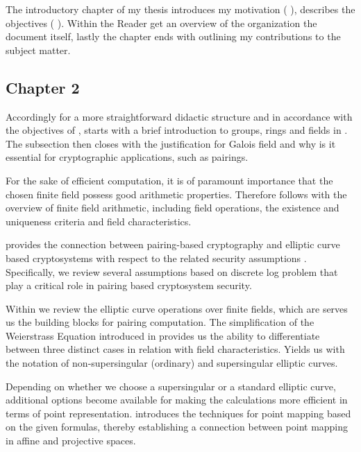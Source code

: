 The introductory chapter of my thesis introduces my motivation ( ), describes the objectives ( ). Within  the Reader get an overview of the organization the document itself, lastly the chapter ends with  outlining my contributions to the subject matter. 



\subsection*{Chapter 2}

Accordingly for a more straightforward didactic structure and  in accordance with the objectives of  , 
starts with a brief introduction to groups, rings and fields in . The subsection then closes with the justification for Galois field and why is it essential for cryptographic applications, such as pairings.


For the sake of efficient computation, it is of paramount importance that the chosen finite field possess good arithmetic properties. Therefore  
  follows with the overview of finite field arithmetic, including field operations, the existence and uniqueness criteria and field characteristics.
  

 provides the connection between pairing-based cryptography and elliptic curve based cryptosystems with respect to the related security assumptions . Specifically, we review several assumptions based on discrete log problem that play a critical role in pairing based cryptosystem security.

Within 
we review the elliptic curve operations over finite fields, which are
serves us the building blocks for pairing computation. 
The simplification of the Weierstrass Equation introduced in  
provides us the ability to differentiate between three distinct cases
in relation with field characteristics. Yields us with the notation
of non-supersingular (ordinary) and supersingular elliptic curves.

Depending on whether we choose a supersingular or a standard elliptic curve, additional options become available for making the calculations more efficient in terms of point representation. 
 introduces the techniques for point mapping  based on the given formulas, thereby establishing a connection between point mapping in affine and projective spaces.


